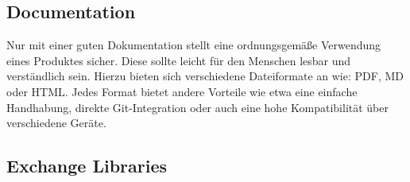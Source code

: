\subsection{Documentation}		%
	Nur mit einer guten Dokumentation stellt eine ordnungsgemäße Verwendung eines Produktes sicher. Diese sollte leicht für den Menschen lesbar und verständlich sein. Hierzu bieten sich verschiedene Dateiformate an wie: \ac{PDF}, \ac{MD} oder \ac{HTML}. Jedes Format bietet andere Vorteile wie etwa eine einfache Handhabung, direkte Git-Integration oder auch eine hohe Kompatibilität über verschiedene Geräte. 

\subsection{Exchange Libraries}










